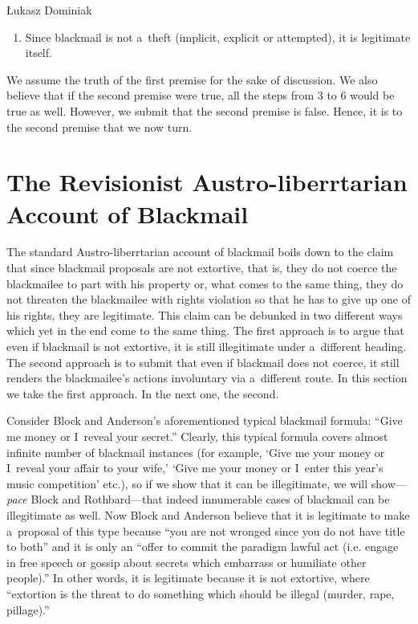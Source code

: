 \begin{artengenv}{Łukasz Dominiak}
\begin{enumerate}
\item Since blackmail is not a~theft (implicit, explicit or attempted), it is legitimate itself.

\end{enumerate}

We assume the truth of the first premise for the sake of discussion. We also believe that if the second premise were true, all the steps from 3 to 6 would be true as well. However, we submit that the second premise is false. Hence, it is to the second premise that we now turn.



\section{The Revisionist Austro-liberrtarian Account of Blackmail}

The standard Austro-liberrtarian account of blackmail boils down to the claim that since blackmail proposals are not extortive, that is, they do not coerce the blackmailee to part with his property or, what comes to the same thing, they do not threaten the blackmailee with rights violation so that he has to give up one of his rights, they are legitimate. This claim can be debunked in two different ways which yet in the end come to the same thing. The first approach is to argue that even if blackmail is not extortive, it is still illegitimate under a~different heading. The second approach is to submit that even if blackmail does not coerce, it still renders the blackmailee's actions involuntary via a~different route. In this section we take the first approach. In the next one, the second.



Consider Block and Anderson's 
\parencite*[][p.546]{block_blackmail_2000} %
 aforementioned typical blackmail formula: ``Give me money or I~reveal your secret.'' Clearly, this typical formula covers almost infinite number of blackmail instances (for example, ‘Give me your money or I~reveal your affair to your wife,' ‘Give me your money or I~enter this year's music competition' etc.), so if we show that it can be illegitimate, we will show---\textit{pace} Block and Rothbard---that indeed innumerable cases of blackmail can be illegitimate as well. Now Block and Anderson 
\parencite*[][p.546]{block_blackmail_2000} %
 believe that it is legitimate to make a~proposal of this type because ``you are not wronged since you do not have title to both'' and it is only an ``offer to commit the paradigm lawful act (i.e. engage in free speech or gossip about secrets which embarrass or humiliate other people).'' In other words, it is legitimate because it is not extortive, where ``extortion is the threat to do something which should be illegal (murder, rape, pillage).''




\end{artengenv}
